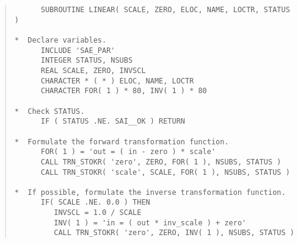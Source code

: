 \begin{quote}
\begin{tabbing} %

\verb#      SUBROUTINE LINEAR( SCALE, ZERO, ELOC, NAME, LOCTR, STATUS )#\\
\verb#                                                       #\\
\verb#*  Declare variables.                                  #\\
\verb#      INCLUDE 'SAE_PAR'                                #\\
\verb#      INTEGER STATUS, NSUBS                            #\\
\verb#      REAL SCALE, ZERO, INVSCL                         #\\
\verb#      CHARACTER * ( * ) ELOC, NAME, LOCTR              #\\
\verb#      CHARACTER FOR( 1 ) * 80, INV( 1 ) * 80           #\\
\verb#                                                       #\\
\verb#*  Check STATUS.                                       #\\
\verb#      IF ( STATUS .NE. SAI__OK ) RETURN                #\\
\verb#                                                       #\\
\verb#*  Formulate the forward transformation function.      #\\
\verb#      FOR( 1 ) = 'out = ( in - zero ) * scale'         #\\
\verb#      CALL TRN_STOKR( 'zero', ZERO, FOR( 1 ), NSUBS, STATUS )#\\
\verb#      CALL TRN_STOKR( 'scale', SCALE, FOR( 1 ), NSUBS, STATUS )#\\
\verb#                                                       #\\
\verb#*  If possible, formulate the inverse transformation function.#\\
\verb#      IF( SCALE .NE. 0.0 ) THEN                        #\\
\verb#         INVSCL = 1.0 / SCALE                          #\\
\verb#         INV( 1 ) = 'in = ( out * inv_scale ) + zero'  #\\
\verb#         CALL TRN_STOKR( 'zero', ZERO, INV( 1 ), NSUBS, STATUS )#\\

\end{tabbing}
\end{quote}

